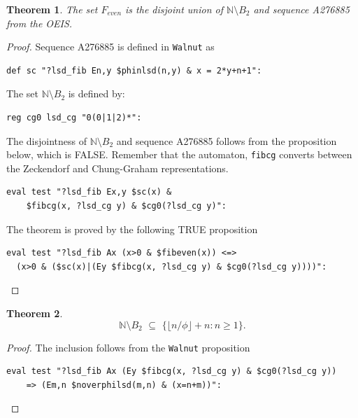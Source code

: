 \documentclass[12pt]{article}
\theoremstyle{plain}
\newtheorem{theorem}{Theorem}
\theoremstyle{case}
\theoremstyle{definition}
\begin{document}
\bigskip
\begin{theorem}
\label{feunion}
The set $F_{even}$ is the disjoint union of $\mathbb{N} \setminus B_{2}$ and sequence A276885 from the OEIS.
\end{theorem}
\begin{proof}
Sequence A276885 is defined in {\tt Walnut} as
\begin{verbatim}
def sc "?lsd_fib En,y $phinlsd(n,y) & x = 2*y+n+1":
\end{verbatim}

The set $\mathbb{N} \setminus B_{2}$ is defined by:
\begin{verbatim}
reg cg0 lsd_cg "0(0|1|2)*":
\end{verbatim}

The disjointness of $\mathbb{N} \setminus B_{2}$ and sequence A276885 follows from the proposition below, which is FALSE. Remember that the automaton, {\tt fibcg} converts between the Zeckendorf and Chung-Graham representations.
\begin{verbatim}
eval test "?lsd_fib Ex,y $sc(x) & 
    $fibcg(x, ?lsd_cg y) & $cg0(?lsd_cg y)":
\end{verbatim}
The theorem is proved by the following TRUE proposition
\begin{verbatim}
eval test "?lsd_fib Ax (x>0 & $fibeven(x)) <=> 
  (x>0 & ($sc(x)|(Ey $fibcg(x, ?lsd_cg y) & $cg0(?lsd_cg y))))":
\end{verbatim}
\end{proof}

\bigskip
\begin{theorem}
$$
\mathbb{N} \setminus B_{2} \,\, \subseteq \,\,  \{ \lfloor n/\phi \rfloor + n : n \geq 1 \}  .
$$
\end{theorem}
\begin{proof}
The inclusion follows from the {\tt Walnut} proposition
\begin{verbatim}
eval test "?lsd_fib Ax (Ey $fibcg(x, ?lsd_cg y) & $cg0(?lsd_cg y)) 
    => (Em,n $noverphilsd(m,n) & (x=n+m))":
\end{verbatim}
\end{proof}

\bigskip
\end{document}
